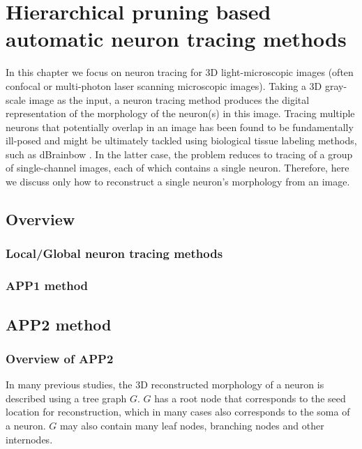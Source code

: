 \chapter{Hierarchical pruning based automatic neuron tracing methods} \label{chpt:auto-nt}
In this chapter we focus on neuron tracing for 3D light-microscopic images (often confocal or multi-photon laser scanning microscopic images). Taking a 3D gray-scale image as the input, a neuron tracing method produces the digital representation of the morphology of the neuron(s) in this image. Tracing multiple neurons that potentially overlap in an image has been found to be fundamentally ill-posed and might be ultimately tackled using biological tissue labeling methods, such as dBrainbow \cite{hampel2011drosophila}. In the latter case, the problem reduces to tracing of a group of single-channel images, each of which contains a single neuron. Therefore, here we discuss only how to reconstruct a single neuron’s morphology from an image. 
\section{Overview}
\subsection{Local/Global neuron tracing methods}
\subsection{APP1 method}
\section{APP2 method}
\subsection{Overview of APP2}
In many previous studies, the 3D reconstructed morphology of a neuron is described using a tree graph $G$.  $G$ has a root node that corresponds to the seed location for reconstruction, which in many cases also corresponds to the soma of a neuron. $G$ may also contain many leaf nodes, branching nodes and other internodes.

